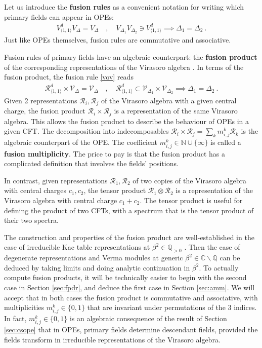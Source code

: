 \documentclass[12pt, a4paper]{article}
\newcommand{\myindex}[1]{\textbf{\boldmath #1}}
\begin{document}
Let us introduce the \myindex{fusion rules} as a convenient notation for writing which primary fields can appear in OPEs:
\begin{align}
 V^d_{\langle 1,1\rangle} V_{\Delta} = V_\Delta \quad , \quad V_{\Delta_1} V_{\Delta_2} \ni V^d_{\langle 1,1\rangle} \implies \Delta_1=\Delta_2\ . 
 \label{vov}
\end{align}
Just like OPEs themselves, fusion rules are commutative and associative.

Fusion rules of primary fields have an algebraic counterpart: the \myindex{fusion product} of the corresponding representations of the Virasoro algebra \cite{kr18}.
In terms of the fusion product, the fusion rule \eqref{vov} reads
\begin{align}
 \mathcal{R}^d_{\langle 1,1\rangle} \times \mathcal{V}_\Delta = \mathcal{V}_\Delta \quad , \quad \mathcal{R}^d_{\langle 1,1\rangle} \subset \mathcal{V}_{\Delta_1}\times \mathcal{V}_{\Delta_2} \implies \Delta_1=\Delta_2\ .
 \label{rtv}
\end{align}
Given 2 representations $\mathcal{R}_i,\mathcal{R}_j$ of the Virasoro algebra with a given central charge, the fusion product $\mathcal{R}_i \times \mathcal{R}_j$ is a representation of the same Virasoro algebra. This allows the fusion product to describe the behaviour of OPEs in a given CFT. The decomposition into indecomposables $\mathcal{R}_i \times \mathcal{R}_j = \sum_k m_{i,j}^k \mathcal{R}_k$ is the algebraic counterpart of the OPE. The coefficient $m_{i,j}^k\in \mathbb{N}\cup\{\infty\}$ is called a \myindex{fusion multiplicity}.
The price to pay is that the fusion product has a complicated definition that involves the fields' positions.

In contrast, given representations $\mathcal{R}_1,\mathcal{R}_2$ of two copies of the Virasoro algebra with central charges $c_1,c_2$, the tensor product $\mathcal{R}_1\otimes \mathcal{R}_2$ is a representation of the Virasoro algebra with central charge $c_1+c_2$. The tensor product is useful for defining the product of two CFTs, with a spectrum that is the tensor product of their two spectra.

The construction and properties of the fusion product are well-established in the case of irreducible Kac table representations at $\beta^2 \in \mathbb{Q}_{>0}$ \cite{gab99}. Then the case of degenerate representations and Verma modules at generic $\beta^2\in \mathbb{C}\backslash\mathbb{Q}$ can be deduced by taking limits and doing analytic continuation in $\beta^2$. To actually compute fusion products, it will be technically easier to begin with the second case in Section \ref{sec:fpdr}, and deduce the first case in Section \ref{sec:amm}. We will accept that in both cases the fusion product is commutative and associative, with multiplicities $m_{i,j}^k\in \{0,1\}$ that are  invariant under permutations of the 3 indices. In fact, $m_{i,j}^k\in \{0,1\}$ is an algebraic consequence of the result of Section \ref{sec:csope} that in OPEs, primary fields determine descendant fields, provided the fields transform in irreducible representations of the Virasoro algebra.
\end{document}
